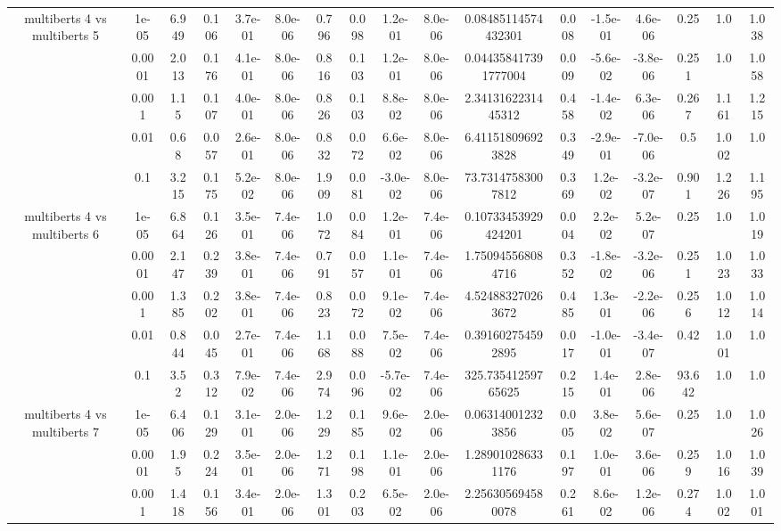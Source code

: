 \begin{tabular}{|c|c|c|c|c|c|c|c|c|c|c|c|c|c|c|c|c|}
\hline
\multirow{5}{*}{multiberts 4 vs multiberts 5} & 1e-05 & 6.949 & 0.106 & 3.7e-01 & 8.0e-06 & 0.796 & 0.098 & 1.2e-01 & 8.0e-06 & 0.08485114574432301 & 0.008 & -1.5e-01 & 4.6e-06 & 0.25 & 1.0 & 1.038 \\
 & 0.0001 & 2.013 & 0.176 & 4.1e-01 & 8.0e-06 & 0.816 & 0.103 & 1.2e-01 & 8.0e-06 & 0.044358417391777004 & 0.009 & -5.6e-02 & -3.8e-06 & 0.251 & 1.0 & 1.058 \\
 & 0.001 & 1.15 & 0.107 & 4.0e-01 & 8.0e-06 & 0.826 & 0.103 & 8.8e-02 & 8.0e-06 & 2.3413162231445312 & 0.458 & -1.4e-02 & 6.3e-06 & 0.267 & 1.161 & 1.215 \\
 & 0.01 & 0.68 & 0.057 & 2.6e-01 & 8.0e-06 & 0.832 & 0.072 & 6.6e-02 & 8.0e-06 & 6.411518096923828 & 0.349 & -2.9e-01 & -7.0e-06 & 0.5 & 1.002 & 1.0 \\
 & 0.1 & 3.215 & 0.175 & 5.2e-02 & 8.0e-06 & 1.909 & 0.081 & -3.0e-02 & 8.0e-06 & 73.73147583007812 & 0.369 & 1.2e-02 & -3.2e-07 & 0.901 & 1.226 & 1.195 \\
\hline
\multirow{5}{*}{multiberts 4 vs multiberts 6} & 1e-05 & 6.864 & 0.126 & 3.5e-01 & 7.4e-06 & 1.072 & 0.084 & 1.2e-01 & 7.4e-06 & 0.10733453929424201 & 0.004 & 2.2e-02 & 5.2e-07 & 0.25 & 1.0 & 1.019 \\
 & 0.0001 & 2.147 & 0.239 & 3.8e-01 & 7.4e-06 & 0.791 & 0.057 & 1.1e-01 & 7.4e-06 & 1.750945568084716 & 0.352 & -1.8e-02 & -3.2e-06 & 0.251 & 1.023 & 1.033 \\
 & 0.001 & 1.385 & 0.202 & 3.8e-01 & 7.4e-06 & 0.823 & 0.072 & 9.1e-02 & 7.4e-06 & 4.524883270263672 & 0.485 & 1.3e-01 & -2.2e-06 & 0.256 & 1.012 & 1.014 \\
 & 0.01 & 0.844 & 0.045 & 2.7e-01 & 7.4e-06 & 1.168 & 0.088 & 7.5e-02 & 7.4e-06 & 0.391602754592895 & 0.017 & -1.0e-01 & -3.4e-07 & 0.42 & 1.001 & 1.0 \\
 & 0.1 & 3.52 & 0.312 & 7.9e-02 & 7.4e-06 & 2.974 & 0.096 & -5.7e-02 & 7.4e-06 & 325.73541259765625 & 0.215 & 1.4e-01 & 2.8e-06 & 93.642 & 1.0 & 1.0 \\
\hline
\multirow{5}{*}{multiberts 4 vs multiberts 7} & 1e-05 & 6.406 & 0.129 & 3.1e-01 & 2.0e-06 & 1.229 & 0.185 & 9.6e-02 & 2.0e-06 & 0.063140012323856 & 0.005 & 3.8e-02 & 5.6e-07 & 0.25 & 1.0 & 1.026 \\
 & 0.0001 & 1.95 & 0.224 & 3.5e-01 & 2.0e-06 & 1.271 & 0.198 & 1.1e-01 & 2.0e-06 & 1.289010286331176 & 0.197 & 1.0e-01 & 3.6e-06 & 0.259 & 1.016 & 1.039 \\
 & 0.001 & 1.418 & 0.156 & 3.4e-01 & 2.0e-06 & 1.301 & 0.203 & 6.5e-02 & 2.0e-06 & 2.256305694580078 & 0.261 & 8.6e-02 & 1.2e-06 & 0.274 & 1.002 & 1.001 \\

\end{tabular}
